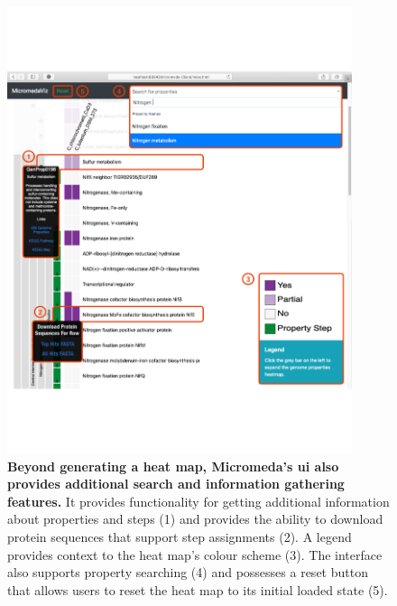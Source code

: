 \begin{figure}[!ht]
  \centering
	\includegraphics[width=0.9\textwidth]{media/micromeda-interface.pdf}
	 \caption[Beyond generating a heat map, Micromeda's UI also provides additional 
search and information gathering features.]{\textbf{Beyond generating a heat 
map, Micromeda's \gls{ui} also provides additional search and information 
gathering features.} It provides functionality for getting additional 
information about properties and steps (1) and provides the ability to download 
protein sequences that support step assignments (2). A legend provides context 
to the heat map's colour scheme (3). The interface also supports property 
searching (4) and possesses a reset button that allows users to reset the heat 
map to its initial loaded state (5).}
	 \label{fig:micromeda-interface}
\end{figure}

